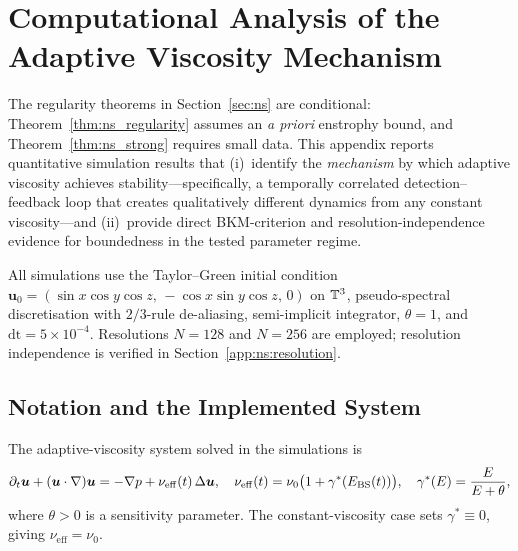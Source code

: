 
\section{Computational Analysis of the Adaptive Viscosity
  Mechanism}\label{app:computational_ns}

The regularity theorems in Section~\ref{sec:ns} are conditional:
Theorem~\ref{thm:ns_regularity} assumes an \emph{a priori}
enstrophy bound, and Theorem~\ref{thm:ns_strong} requires
small data.  This appendix reports quantitative simulation
results that (i)~identify the \emph{mechanism} by which adaptive
viscosity achieves stability---specifically, a temporally
correlated detection--feedback loop that creates qualitatively
different dynamics from any constant viscosity---and
(ii)~provide direct BKM-criterion and resolution-independence
evidence for boundedness in the tested parameter regime.

All simulations use the Taylor--Green initial condition
$\bm{u}_0 = (\sin x\cos y\cos z,\,-\cos x\sin y\cos z,\,0)$
on $\mathbb{T}^3$, pseudo-spectral discretisation with
$2/3$-rule de-aliasing, semi-implicit integrator, $\theta=1$,
and $\mathrm{dt} = 5\times 10^{-4}$.  Resolutions $N=128$
and $N=256$ are employed; resolution independence is verified
in Section~\ref{app:ns:resolution}.

\subsection{Notation and the Implemented System}
\label{app:ns:notation}

The adaptive-viscosity system solved in the simulations is
\begin{equation}\label{eq:app_ns}
  \partial_t\bm{u}+(\bm{u}\cdot\nabla)\bm{u}
  = -\nabla p + \nu_{\mathrm{eff}}(t)\,\Delta\bm{u},\quad
  \nu_{\mathrm{eff}}(t) = \nu_0\bigl(1+\gamma^*(E_{\mathrm{BS}}(t))\bigr),\quad
  \gamma^*(E) = \frac{E}{E+\theta},
\end{equation}
where $\theta > 0$ is a sensitivity parameter.  The constant-viscosity
case sets $\gamma^* \equiv 0$, giving $\nu_{\mathrm{eff}} = \nu_0$.

